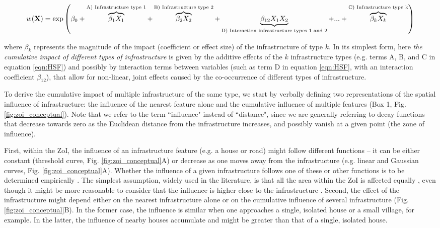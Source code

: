 \documentclass[titlepage]{article}
\begin{document}
\begin{equation}
\centering
\label{eqn:HSF}
    w(\textbf{X}) = \exp \left( \beta_0 + \overbrace{\beta_1 X_1}^\text{A) Infrastructure type 1} + \overbrace{\beta_2 X_2}^\text{B) Infrastructure type 2} + \underbrace{\beta_{12} X_1 X_2}_\text{D) Interaction infrastructure types 1 and 2} + ... + \overbrace{\beta_k X_k}^\text{C) Infrastructure type k} \right)
\end{equation}

where $\beta_k$ represents the magnitude of the impact (coefficient or effect size) of the infrastructure of type $k$. In its simplest form, here \textit{the cumulative impact of different types of infrastructure} is given by the additive effects of the $k$ infrastructure types (e.g. terms A, B, and C in equation \ref{eqn:HSF}) and possibly by interaction terms between variables (such as term D in equation \ref{eqn:HSF}, with an interaction coefficient $\beta_{12}$), that allow for non-linear, joint effects caused by the co-occurrence of different types of infrastructure. 

To derive the cumulative impact of multiple infrastructure of the same type, we start by verbally defining two representations of the spatial influence of infrastructure: the influence of the nearest feature alone and the cumulative influence of multiple features (Box 1, Fig. \ref{fig:zoi_conceptual}). Note that we refer to the term ``influence" instead of ``distance", since we are generally referring to decay functions that decrease towards zero as the Euclidean distance from the infrastructure increases, and possibly vanish at a given point (the zone of influence).

First, within the ZoI, the influence of an infrastructure feature (e.g. a house or road) might follow different functions -- it can be either constant (threshold curve, Fig. \ref{fig:zoi_conceptual}A) or decrease as one moves away from the infrastructure (e.g. linear and Gaussian curves, Fig. \ref{fig:zoi_conceptual}A). 
Whether the influence of a given infrastructure follows one of these or other functions is to be determined empirically \citep{miguet_how_2017}. The simplest assumption, widely used in the literature, is that all the area within the ZoI is affected equally \citep[e.g][]{quinonezpinon_design_2007}, even though it might be more reasonable to consider that the influence is higher close to the infrastructure \citep[][]{skarin_out_2018, zeller_multi-level_2017}. Second, the effect of the infrastructure might depend either on the nearest infrastructure alone or on the cumulative influence of several infrastructure (Fig. \ref{fig:zoi_conceptual}B). In the former case, the influence is similar when one approaches a single, isolated house or a small village, for example. In the latter, the influence of nearby houses accumulate and might be greater than that of a single, isolated house.
\end{document}
